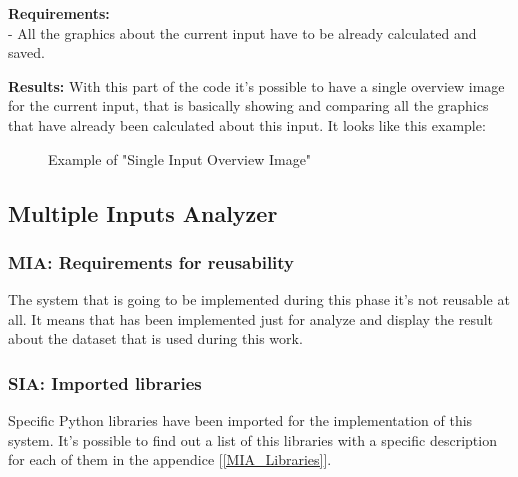 \textbf{Requirements:}\\
- All the graphics about the current input have to be already calculated and saved.

\textbf{Results:}
With this part of the code it's possible to have a single overview image for the current input, that is basically showing and comparing all the graphics that have already been calculated about this input. It looks like this example:
\begin{figure}[H]
    \caption{Example of "Single Input Overview Image"}
\end{figure}

\newpage

\subsection{Multiple Inputs Analyzer}
\subsubsection{MIA: Requirements for reusability}
The system that is going to be implemented during this phase it's not reusable at all.
It means that has been implemented just for analyze and display the result about the dataset that is used during this work.

\subsubsection{SIA: Imported libraries}
Specific Python libraries have been imported for the implementation of this system.
It's possible to find out a list of this libraries with a specific description for each of them in the appendice [\ref{MIA_Libraries}].

